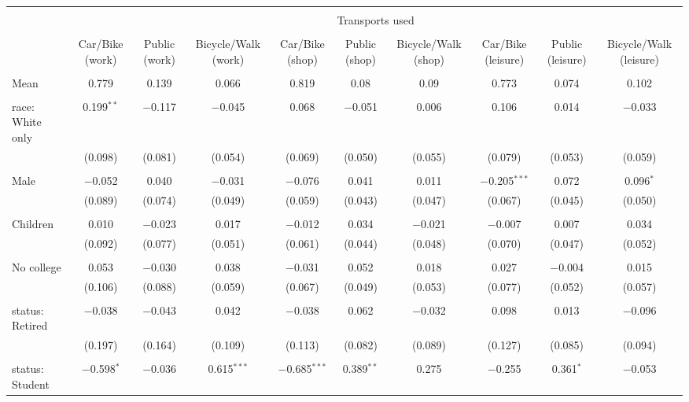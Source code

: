 
\begin{tabular}{@{\extracolsep{5pt}}lccccccccc} 
\\[-1.8ex]\hline 
\hline \\[-1.8ex] 
 & \multicolumn{9}{c}{Transports used} \\ 
\cline{2-10} 
\\[-1.8ex] & Car/Bike (work) & Public (work) & Bicycle/Walk (work) & Car/Bike (shop) & Public (shop) & Bicycle/Walk (shop) & Car/Bike (leisure) & Public (leisure) & Bicycle/Walk (leisure) \\ 
\hline \\[-1.8ex] 
 Mean & 0.779 & 0.139 & 0.066 & 0.819 & 0.08 & 0.09 & 0.773 & 0.074 & 0.102  \\ \hline \\[-1.8ex] race: White only & 0.199$^{**}$ & $-$0.117 & $-$0.045 & 0.068 & $-$0.051 & 0.006 & 0.106 & 0.014 & $-$0.033 \\ 
  & (0.098) & (0.081) & (0.054) & (0.069) & (0.050) & (0.055) & (0.079) & (0.053) & (0.059) \\ 
  & & & & & & & & & \\ 
 Male & $-$0.052 & 0.040 & $-$0.031 & $-$0.076 & 0.041 & 0.011 & $-$0.205$^{***}$ & 0.072 & 0.096$^{*}$ \\ 
  & (0.089) & (0.074) & (0.049) & (0.059) & (0.043) & (0.047) & (0.067) & (0.045) & (0.050) \\ 
  & & & & & & & & & \\ 
 Children & 0.010 & $-$0.023 & 0.017 & $-$0.012 & 0.034 & $-$0.021 & $-$0.007 & 0.007 & 0.034 \\ 
  & (0.092) & (0.077) & (0.051) & (0.061) & (0.044) & (0.048) & (0.070) & (0.047) & (0.052) \\ 
  & & & & & & & & & \\ 
 No college & 0.053 & $-$0.030 & 0.038 & $-$0.031 & 0.052 & 0.018 & 0.027 & $-$0.004 & 0.015 \\ 
  & (0.106) & (0.088) & (0.059) & (0.067) & (0.049) & (0.053) & (0.077) & (0.052) & (0.057) \\ 
  & & & & & & & & & \\ 
 status: Retired & $-$0.038 & $-$0.043 & 0.042 & $-$0.038 & 0.062 & $-$0.032 & 0.098 & 0.013 & $-$0.096 \\ 
  & (0.197) & (0.164) & (0.109) & (0.113) & (0.082) & (0.089) & (0.127) & (0.085) & (0.094) \\ 
  & & & & & & & & & \\ 
 status: Student & $-$0.598$^{*}$ & $-$0.036 & 0.615$^{***}$ & $-$0.685$^{***}$ & 0.389$^{**}$ & 0.275 & $-$0.255 & 0.361$^{*}$ & $-$0.053 \\ 

\end{tabular}

